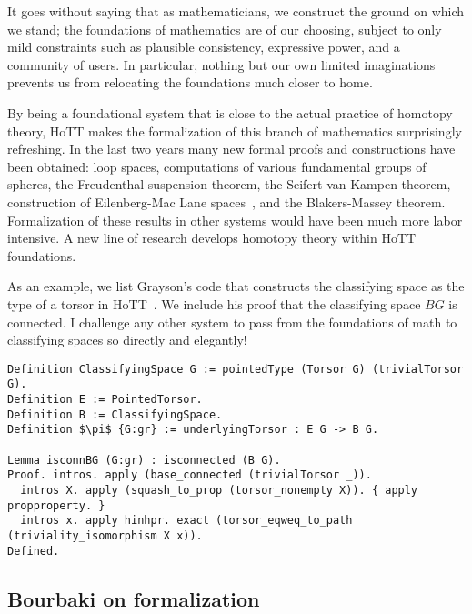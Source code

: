 \documentclass[brochure,english,12pt]{bourbaki}
\theoremstyle{plain}
\begin{document}
It goes without saying that as mathematicians, we construct the ground
on which we stand; the foundations of mathematics are of our choosing,
subject to only mild constraints such as plausible consistency,
expressive power, and a community of users.  In particular, nothing
but our own limited imaginations prevents us from relocating the
foundations much closer to home.

By being a foundational system that is close to the actual practice of
homotopy theory, HoTT makes the formalization of this branch of
mathematics surprisingly refreshing.  In the last two years many new
formal proofs and constructions have been obtained: loop spaces,
computations of various fundamental groups of spheres, the Freudenthal
suspension theorem, the Seifert-van Kampen theorem, construction of
Eilenberg-Mac Lane spaces~\cite{licataeilenberg}, and the
Blakers-Massey theorem. Formalization of these results in other
systems would have been much more labor intensive.  A new line of
research develops homotopy theory within HoTT foundations.

As an example, we list Grayson's code that constructs the classifying
space as the type of a torsor in HoTT~\cite{Ktheory}.  We include his
proof that the classifying space $BG$ is connected.  I challenge any
other system to pass from the foundations of math to classifying
spaces so directly and elegantly!


\begin{lstlisting}[keepspaces=true,stringstyle=\tt,basicstyle=\small,frame=single,framesep=8pt,mathescape,morekeywords={Definition,Lemma,Proof,Defined},columns=flexible]
Definition ClassifyingSpace G := pointedType (Torsor G) (trivialTorsor G).
Definition E := PointedTorsor.
Definition B := ClassifyingSpace.
Definition $\pi$ {G:gr} := underlyingTorsor : E G -> B G.

Lemma isconnBG (G:gr) : isconnected (B G).
Proof. intros. apply (base_connected (trivialTorsor _)).
  intros X. apply (squash_to_prop (torsor_nonempty X)). { apply propproperty. }
  intros x. apply hinhpr. exact (torsor_eqweq_to_path (triviality_isomorphism X x)). 
Defined.
\end{lstlisting}





\subsection{Bourbaki on formalization}
\end{document}
